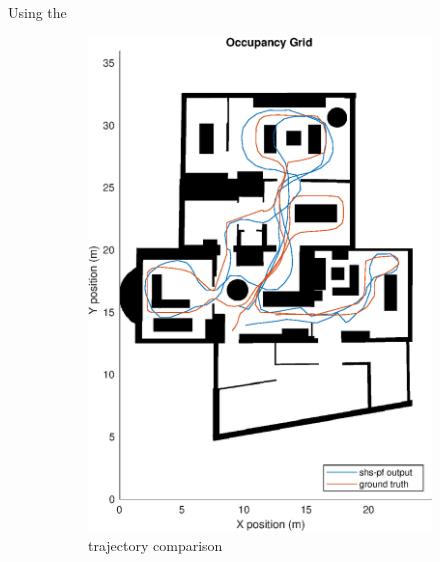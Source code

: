 Using the 
\begin{figure}[H]
	\centering
	\begin{subfigure}[t]{.45\textwidth}
		\centering
		\includegraphics[width=0.9\linewidth]{images/20201029_1603_shs-pf_trial_1_2}
		\caption{trajectory comparison}
		\label{fig:shspf_trial2_on_map}
	\end{subfigure}
	\begin{subfigure}[t]{.45\textwidth}
		\centering

\end{subfigure}
\end{figure}
